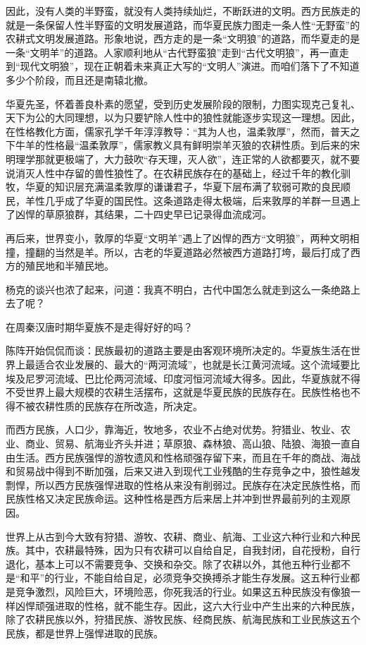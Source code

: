 \par 因此，没有人类的半野蛮，就没有人类持续灿烂，不断跃进的文明。西方民族走的就是一条保留人性半野蛮的文明发展道路，而华夏民族力图走一条人性“无野蛮”的农耕式文明发展道路。形象地说，西方走的是一条“文明狼”的道路，而华夏走的是一条“文明羊”的道路。人家顺利地从“古代野蛮狼”走到“古代文明狼”，再一直走到“现代文明狼”，现在正朝着未来真正大写的“文明人”演进。而咱们落下了不知道多少个阶段，而且还是南辕北撤。
\par 华夏先圣，怀着善良朴素的愿望，受到历史发展阶段的限制，力图实现克己复礼、天下为公的大同理想，以为只要铲除人性中的狼性就能逐步实现这一理想。因此，在性格教化方面，儒家孔学千年淳淳教导：“其为人也，温柔敦厚”，然而，普天之下牛羊的性格最“温柔敦厚”，儒家教义具有鲜明崇羊灭狼的农耕性质。到后来的宋明理学那就更极端了，大力鼓吹“存天理，灭人欲”，连正常的人欲都要灭，就不要说消灭人性中存留的兽性狼性了。在农耕民族存在的基础上，经过千年的教化驯牧，华夏的知识层充满温柔敦厚的谦谦君子，华夏下层布满了软弱可欺的良民顺民，羊性几乎成了华夏的国民性。这条道路走得太极端，后来敦厚的羊群一旦遇上了凶悍的草原狼群，其结果，二十四史早已记录得血流成河。
\par 再后来，世界变小，敦厚的华夏“文明羊”遇上了凶悍的西方“文明狼”，两种文明相撞，撞翻的当然是羊。所以，古老的华夏道路必然被西方道路打垮，最后打成了西方的殖民地和半殖民地。
\par 杨克的谈兴也浓了起来，问道：我真不明白，古代中国怎么就走到这么一条绝路上去了呢？
\par 在周秦汉唐时期华夏族不是走得好好的吗？
\par 陈阵开始侃侃而谈：民族最初的道路主要是由客观环境所决定的。华夏族生活在世界上最适合农业发展的、最大的“两河流域”，也就是长江黄河流域。这个流域要比埃及尼罗河流域、巴比伦两河流域、印度河恒河流域大得多。因此，华夏族就不得不受世界上最大规模的农耕生活摆布，这就是华夏民族的民族存在。民族性格也不得不被农耕性质的民族存在所改造，所决定。
\par 而西方民族，人口少，靠海近，牧地多，农业不占绝对优势。狩猎业、牧业、农业、商业、贸易、航海业齐头并进；草原狼、森林狼、高山狼、陆狼、海狼一直自由生活。西方民族强悍的游牧遗风和性格顽强存留下来，而且在千年的商战、海战和贸易战中得到不断加强，后来又进入到现代工业残酷的生存竞争之中，狼性越发剽悍，所以西方民族强悍进取的性格从来没有削弱过。民族存在决定民族性格，而民族性格又决定民族命运。这种性格是西方后来居上并冲到世界最前列的主观原因。
\par 世界上从古到今大致有狩猎、游牧、农耕、商业、航海、工业这六种行业和六种民族。其中，农耕最特殊，因为只有农耕可以自给自足，自我封闭，自花授粉，自行退化，基本上可以不需要竞争、交换和杂交。除了农耕以外，其他五种行业都不是“和平”的行业，不能自给自足，必须竞争交换搏杀才能生存发展。这五种行业都是竞争激烈，风险巨大，环境险恶，你死我活的行业。如果这五种民族没有像狼一样凶悍顽强进取的性格，就不能生存。因此，这六大行业中产生出来的六种民族，除了农耕民族以外，狩猎民族、游牧民族、经商民族、航海民族和工业民族这五个民族，都是世界上强悍进取的民族。
